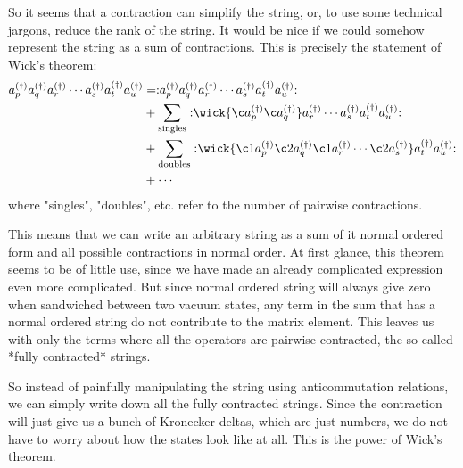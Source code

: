 \documentclass{article}
\begin{document}
So it seems that a contraction can simplify the string, or, to use some
technical jargons, reduce the rank of the string. It would be nice if we
could somehow represent the string as a sum of contractions. This is
precisely the statement of Wick's theorem:
$$
	\begin{aligned}
		a_{p}^{(\dagger)} a_{q}^{(\dagger)} a_{r}^{(\dagger)} \cdots
		a_{s}^{(\dagger)} a_{t}^{(\dagger)} a_{u}^{(\dagger)}
		 & = :\mathrel{a_{p}^{(\dagger)} a_{q}^{(\dagger)} a_{r}^{(\dagger)} \cdots a_{s}^{(\dagger)} a_{t}^{(\dagger)} a_{u}^{(\dagger)}}:                                        \\
		 & + \sum_{\mathrm{singles}} :\mathrel{\wick{\c a_p^{(\dagger)} \c a_q^{(\dagger)}} a_{r}^{(\dagger)} \cdots a_{s}^{(\dagger)} a_{t}^{(\dagger)} a_{u}^{(\dagger)}}:       \\
		 & + \sum_{\mathrm{doubles}} :\mathrel{\wick{\c1 a_p^{(\dagger)} \c2 a_q^{(\dagger)} \c1 a_r^{(\dagger)} \cdots \c2 a_s^{(\dagger)}} a_{t}^{(\dagger)} a_{u}^{(\dagger)}}: \\
		 & + \cdots
	\end{aligned}
$$
where "singles", "doubles", etc. refer to the number of pairwise contractions.

This means that we can write an arbitrary string as a sum of it normal ordered
form and all possible contractions in normal order. At first glance, this
theorem seems to be of little use, since we have made an already complicated
expression even more complicated. But since normal ordered string will always
give zero when sandwiched between two vacuum states, any term in the sum that
has a normal ordered string do not contribute to the matrix element. This
leaves us with only the terms where all the operators are pairwise
contracted, the so-called *fully contracted* strings.

So instead of painfully manipulating the string using anticommutation
relations, we can simply write down all the fully contracted strings.
Since the contraction will just give us a bunch of Kronecker deltas,
which are just numbers, we do not have to worry about how the states
look like at all. This is the power of Wick's theorem.
\end{document}

